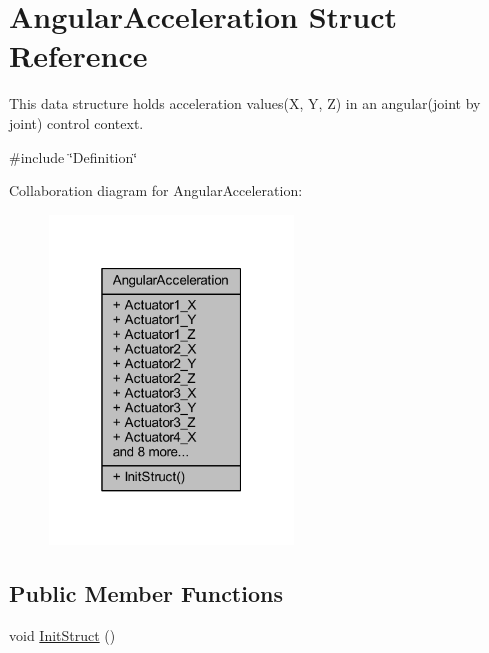 \hypertarget{structAngularAcceleration}{}\section{Angular\+Acceleration Struct Reference}
\label{structAngularAcceleration}


This data structure holds acceleration values(\+X, Y, Z) in an angular(joint by joint) control context.  




{\ttfamily \#include \char`\"{}Definition\char`\"{}}



Collaboration diagram for Angular\+Acceleration\+:
\nopagebreak
\begin{figure}[H]
\begin{center}
\leavevmode
\includegraphics[width=184pt]{d4/de1/structAngularAcceleration__coll__graph}
\end{center}
\end{figure}
\subsection*{Public Member Functions}
\begin{DoxyCompactItemize}
\item 
void \hyperlink{structAngularAcceleration_a4afb405ec59c4f2ceac6302021eaebf8}{Init\+Struct} ()
\end{DoxyCompactItemize}
